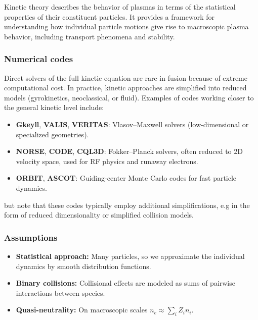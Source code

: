 \documentclass[10pt]{book}
\begin{document}
Kinetic theory describes the behavior of plasmas in terms of the statistical properties of their constituent particles. It provides a framework for understanding how individual particle motions give rise to macroscopic plasma behavior, including transport phenomena and stability.

\subsubsection{Numerical codes}
Direct solvers of the full kinetic equation are rare in fusion because of extreme computational cost. 
In practice, kinetic approaches are simplified into reduced models (gyrokinetics, neoclassical, or fluid).
Examples of codes working closer to the general kinetic level include:
\begin{itemize}
    \item \textbf{Gkeyll}, \textbf{VALIS}, \textbf{VERITAS}: Vlasov--Maxwell solvers (low-dimensional or specialized geometries).
    \item \textbf{NORSE}, \textbf{CODE}, \textbf{CQL3D}: Fokker--Planck solvers, often reduced to 2D velocity space, used for RF physics and runaway electrons.
    \item \textbf{ORBIT}, \textbf{ASCOT}: Guiding-center Monte Carlo codes for fast particle dynamics.
\end{itemize}
but note that these codes typically employ additional simplifications, e.g in the form of reduced dimensionality or simplified collision models.


\subsubsection{Assumptions}
\begin{itemize}
    \item \textbf{Statistical approach:} Many particles, so we approximate the individual dynamics by smooth distribution functions.
    \item \textbf{Binary collisions:} Collisional effects are modeled as sums of pairwise interactions between species.
    \item \textbf{Quasi-neutrality:} On macroscopic scales $n_e \approx \sum_i Z_i n_i$.
\end{itemize}
\end{document}
